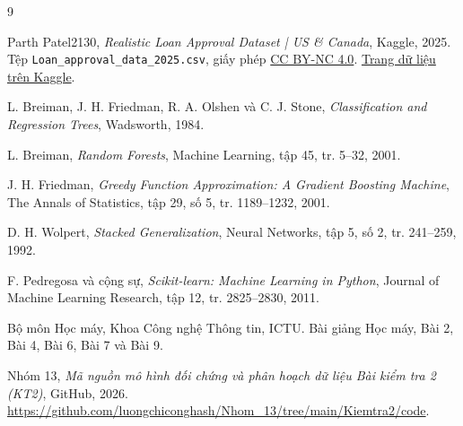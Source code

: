 \documentclass[12pt,a4paper,oneside]{report}
\newcommand{\nhom}{Nhóm 13}
\begin{document}
\begin{thebibliography}{9}

Parth Patel2130, \textit{Realistic Loan Approval Dataset | US \& Canada}, Kaggle, 2025.
Tệp \texttt{Loan\_approval\_data\_2025.csv}, giấy phép \href{https://creativecommons.org/licenses/by-nc/4.0/}{CC BY-NC 4.0}.
\href{https://www.kaggle.com/datasets/parthpatel2130/realistic-loan-approval-dataset-us-and-canada}{Trang dữ liệu trên Kaggle}.

L. Breiman, J. H. Friedman, R. A. Olshen và C. J. Stone,
\textit{Classification and Regression Trees}, Wadsworth, 1984.

L. Breiman, \textit{Random Forests}, Machine Learning, tập 45, tr. 5--32, 2001.

J. H. Friedman, \textit{Greedy Function Approximation: A Gradient Boosting Machine},
The Annals of Statistics, tập 29, số 5, tr. 1189--1232, 2001.

D. H. Wolpert, \textit{Stacked Generalization}, Neural Networks, tập 5, số 2,
tr. 241--259, 1992.

F. Pedregosa và cộng sự, \textit{Scikit-learn: Machine Learning in Python},
Journal of Machine Learning Research, tập 12, tr. 2825--2830, 2011.

Bộ môn Học máy, Khoa Công nghệ Thông tin, ICTU.
Bài giảng Học máy, Bài 2, Bài 4, Bài 6, Bài 7 và Bài 9.

\nhom, \textit{Mã nguồn mô hình đối chứng và phân hoạch dữ liệu Bài kiểm tra 2 (KT2)}, GitHub, 2026.
\url{https://github.com/luongchiconghash/Nhom_13/tree/main/Kiemtra2/code}.

\end{thebibliography}
\end{document}
